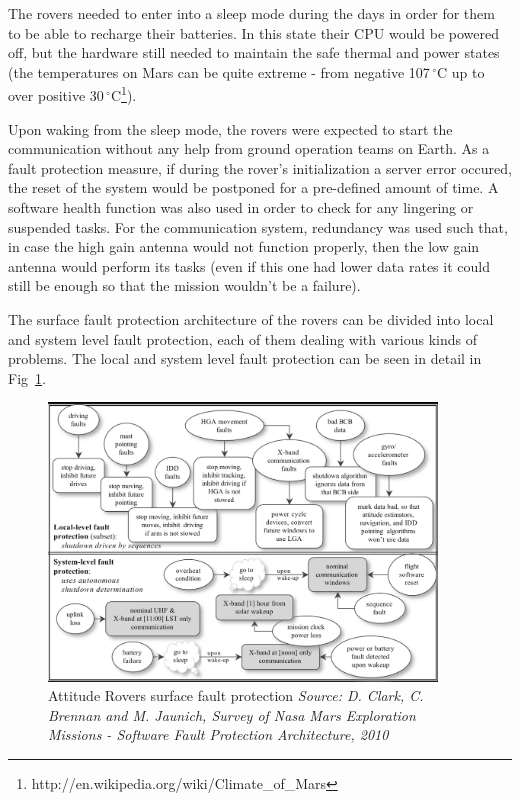 The rovers needed to enter into a sleep mode during the days in order for them
to be able to recharge their batteries. In this state their CPU would be powered
off, but the hardware still needed to maintain the safe thermal and power states
(the temperatures on Mars can be quite extreme - from negative
107$\,^{\circ}\mathrm{C}$ up to over positive
30$\,^{\circ}\mathrm{C}$\footnote{http://en.wikipedia.org/wiki/Climate\_of\_Mars}).

Upon waking from the sleep mode, the rovers were expected to start the
communication without any help from ground operation teams on Earth. As a fault
protection measure, if during the rover's initialization a server error occured,
the reset of the system would be postponed for a pre-defined amount of time. A
software health function was also used in order to check for any lingering or
suspended tasks. For the communication system, redundancy was used such that, in
case the high gain antenna would not function properly, then the low gain
antenna would perform its tasks (even if this one had lower data rates it could
still be enough so that the mission wouldn't be a failure).

The surface fault protection architecture of the rovers can be divided into
local and system level fault protection, each of them dealing with various kinds of
problems. The local and system level fault protection can be seen in detail in
Fig~\ref{fig:rovers}.
\cite{fprot}

\begin{figure}[htb]
	\begin{center}
	\includegraphics[width=0.92\textwidth]{img/rovers.png}
	\caption{Attitude Rovers surface fault protection\small{\textit{ Source: D.
	Clark, C. Brennan and M. Jaunich, Survey of Nasa Mars Exploration Missions -
	Software Fault Protection Architecture, 2010}}}
	\label{fig:rovers}
	\end{center}
\end{figure}

